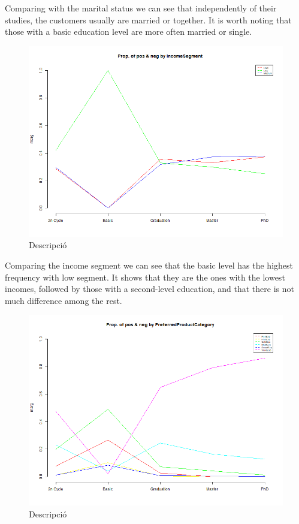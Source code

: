 Comparing with the marital status we can see that independently of their studies, the customers usually are married or together. It is worth noting that those with a basic education level are more often married or single.
\begin{figure}[H]
    \centering
    \includegraphics[width= 1\linewidth]{Imatges/prop_cond_class_IncomeSegment_4_legend.png}
    \caption{Descripció}
    \label{fig:scree_plot_3} %
\end{figure}

Comparing the income segment we can see that the basic level has the highest frequency with low segment. It shows that they are the ones with the lowest incomes, followed by those with a second-level education, and that there is not much difference among the rest.
\begin{figure}[H]
    \centering
    \includegraphics[width= 1\linewidth]{Imatges/prop_cond_class_PreferredProductCategory_4_legend.png}
    \caption{Descripció}
    \label{fig:scree_plot_4} %
\end{figure}

